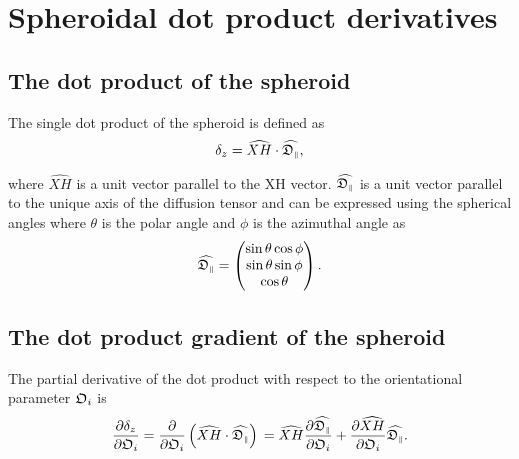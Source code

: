 
\newpage
\section{Spheroidal dot product derivatives}




\subsection{The dot product of the spheroid}

The single dot product of the spheroid is defined as
\begin{equation}
    \delta_z = \widehat{XH} \cdot \widehat{\mathfrak{D}_{\scriptscriptstyle \parallel}},
\end{equation}

\noindent where $\widehat{XH}$ is a unit vector parallel to the XH vector.  $\widehat{\mathfrak{D}_{\scriptscriptstyle \parallel}}$ is a unit vector parallel to the unique axis of the diffusion tensor and can be expressed using the spherical angles where $\theta$ is the polar angle and $\phi$ is the azimuthal angle as
\begin{equation}
    \widehat{\mathfrak{D}_{\scriptscriptstyle \parallel}} = \begin{pmatrix}
        \sin \theta \cos \phi \\
        \sin \theta \sin \phi \\
        \cos \theta \\
    \end{pmatrix}.
\end{equation}




\subsection{The dot product gradient of the spheroid}

The partial derivative of the dot product with respect to the orientational parameter $\mathfrak{O}_i$ is
\begin{equation}
    \frac{\partial \delta_z}{\partial \mathfrak{O}_i}
        = \frac{\partial}{\partial \mathfrak{O}_i} \left( \widehat{XH} \cdot \widehat{\mathfrak{D}_{\scriptscriptstyle \parallel}} \right) \\
        = \widehat{XH} \frac{\partial \widehat{\mathfrak{D}_{\scriptscriptstyle \parallel}}}{\partial \mathfrak{O}_i}  +  \frac{\partial \widehat{XH}}{\partial \mathfrak{O}_i} \widehat{\mathfrak{D}_{\scriptscriptstyle \parallel}}.
\end{equation}

